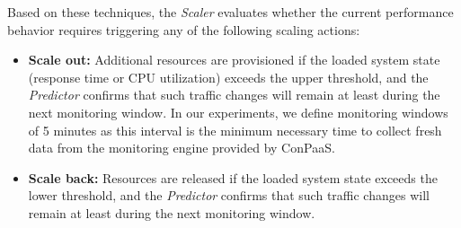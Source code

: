 Based on these techniques, the \emph{Scaler} evaluates whether the current performance behavior requires triggering any of the following scaling actions:

\begin{itemize}

\item \textbf{Scale out:} Additional resources are provisioned if the loaded system state (response time or CPU utilization) exceeds the upper threshold, and the \emph{Predictor} confirms that such traffic changes will remain at least during the next monitoring window. In our experiments, we define monitoring windows of 5 minutes as this interval is the minimum necessary time to collect fresh data from the monitoring engine provided by ConPaaS. 

\item \textbf{Scale back:} Resources are released if the loaded system state exceeds the lower threshold, and the \emph{Predictor} confirms that such traffic changes will remain at least during the next monitoring window.

\end{itemize}






